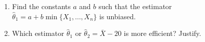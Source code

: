 \documentclass[12pt]{article}
\begin{document}
\begin{enumerate}
\begin{enumerate}
\item Find the constants  $a$ and $b$ such that the estimator  $\hat \theta_1 = a + b\min\{X_1, \ldots, X_n\}$ is unbiased.
\item Which estimator $\hat \theta_1$ or $\hat \theta_2 = \bar X - 20$ is more efficient? Justify.
\end{enumerate}

\end{enumerate}
\end{document}
